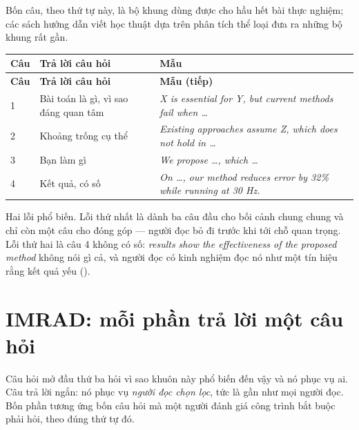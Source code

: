 \documentclass[../../english.tex]{subfiles}
\begin{document}
Bốn câu, theo thứ tự này, là bộ khung dùng được cho hầu hết bài thực nghiệm; các sách hướng dẫn viết học thuật dựa trên phân tích thể loại đưa ra những bộ khung rất gần\cite{swalesfeak2012}.

\begin{center}\footnotesize
{}
\begin{longtable}{@{}L{1.4cm}L{4.3cm}L{8.5cm}@{}}
\toprule
\textbf{Câu} & \textbf{Trả lời câu hỏi} & \textbf{Mẫu}\\
\midrule
\endfirsthead
\toprule
\textbf{Câu} & \textbf{Trả lời câu hỏi} & \textbf{Mẫu (tiếp)}\\
\midrule
{} & Bài toán là gì, vì sao đáng quan tâm & \emph{X is essential for Y, but current methods fail when \ldots}\\
2 & Khoảng trống cụ thể & \emph{Existing approaches assume Z, which does not hold in \ldots}\\
3 & Bạn làm gì & \emph{We propose \ldots, which \ldots}\\
4 & Kết quả, có số & \emph{On \ldots, our method reduces error by 32\% while running at 30 Hz.}\\
\bottomrule
\end{longtable}
\end{center}

Hai lỗi phổ biến. Lỗi thứ nhất là dành ba câu đầu cho bối cảnh chung chung và chỉ còn một câu cho đóng góp --- người đọc bỏ đi trước khi tới chỗ quan trọng. Lỗi thứ hai là câu 4 không có số: \emph{results show the effectiveness of the proposed method} không nói gì cả, và người đọc có kinh nghiệm đọc nó như một tín hiệu rằng kết quả yếu ().

\begin{capdoi}
\end{capdoi}

\section{IMRAD: mỗi phần trả lời một câu hỏi}

Câu hỏi mở đầu thứ ba hỏi vì sao khuôn này phổ biến đến vậy và nó phục vụ ai. Câu trả lời ngắn: nó phục vụ \emph{người đọc chọn lọc}, tức là gần như mọi người đọc. Bốn phần tương ứng bốn câu hỏi mà một người đánh giá công trình bắt buộc phải hỏi, theo đúng thứ tự đó.
\end{document}
